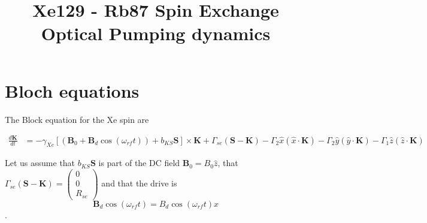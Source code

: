 \documentclass{article}
\begin{document}
\title{Xe129 - Rb87 Spin Exchange Optical Pumping dynamics}
\maketitle



\section{Bloch equations}
The Block equation for the Xe spin are

\begin{align}
    \frac{d \mathbf{K}}{d t} &= -\gamma_{Xe}\left[\left( \mathbf{B}_0 + \mathbf{B}_d \cos{(\omega_{rf} t)}\right) + b_{KS} \mathbf{S}\right] \times\mathbf{K}  +\Gamma_{se} \left( \mathbf{S} - \mathbf{K}\right) - \Gamma_2 \hat{x}\left(\hat{x}\cdot \mathbf{K}\right)  - \Gamma_2 \hat{y}\left(\hat{y}\cdot \mathbf{K}\right) -  \Gamma_1 \hat{z}\left(\hat{z}\cdot \mathbf{K}\right)
\end{align}

Let us assume that $b_{KS} \mathbf{S}$ is part of the DC field $\mathbf{B}_0=B_0 \hat{z}$, that $\Gamma_{se} \left( \mathbf{S} - \mathbf{K}\right)=\left(\begin{array}{c}0\\0\\R_{se}\end{array}\right)$ and that the drive is $$\mathbf{B}_d \cos{(\omega_{rf} t)} =B_d \cos{(\omega_{rf} t)}\hat{x}$$ .
\end{document}
